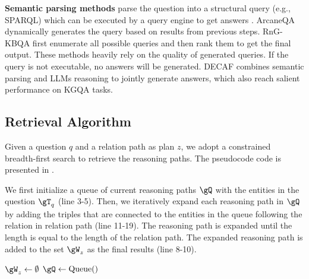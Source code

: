 \textbf{Semantic parsing methods} parse the question into a structural query (e.g., SPARQL) which can be executed by a query engine to get answers \citep{sun2020sparqa,lan2020query}. ArcaneQA \citep{gu2022arcaneqa} dynamically generates the query based on results from previous steps. RnG-KBQA \citep{ye2022rng} first enumerate all possible queries and then rank them to get the final output. These methods heavily rely on the quality of generated queries. If the query is not executable, no answers will be generated. DECAF \citep{yu2022decaf} combines semantic parsing and LLMs reasoning to jointly generate answers, which also reach salient performance on KGQA tasks.

\subsection{Retrieval Algorithm}\label{app:retrieval}
Given a question $q$ and a relation path as plan $z$, we adopt a constrained breadth-first search to retrieve the reasoning paths. The pseudocode code is presented in .

We first initialize a queue of current reasoning paths $\gQ$ with the entities in the question $\gT_q$ (line 3-5). Then, we iteratively expand each reasoning path in $\gQ$ by adding the triples that are connected to the entities in the queue following the relation in relation path (line 11-19). The reasoning path is expanded until the length is equal to the length of the relation path. The expanded reasoning path is added to the set $\gW_z$ as the final results (line 8-10).

\begin{algorithm}
    \caption{Retrieve reasoning paths based on relation paths}\label{alg:retrieval}

    $\gW_z \gets \emptyset$\;
    $\gQ \gets \text{Queue()}$\;

    \;

\end{algorithm}

